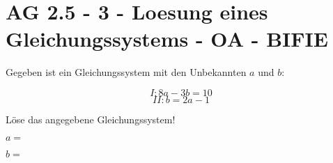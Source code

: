 \section{AG 2.5 - 3 - Loesung eines Gleichungssystems - OA - BIFIE}

\begin{beispiel}[AG 2.5]{1} %
		Gegeben ist ein Gleichungssystem mit den Unbekannten $a$ und $b$:
		
	\[I : 8a-3b = 10  \]
	\[ II : b = 2a -1\]

Löse das angegebene Gleichungssystem!

\leer

$a=$ 
\leer

$b=$ 	
\end{beispiel}